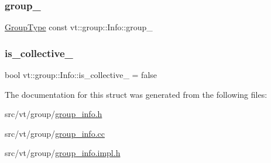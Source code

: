 \mbox{\label{structvt_1_1group_1_1_info_acf2b210e3a0cb0d52649e42f07bc2503}} 
\subsubsection{\texorpdfstring{group\+\_\+}{group\_}}
{\footnotesize\ttfamily \hyperlink{namespacevt_a27b5e4411c9b6140c49100e050e2f743}{Group\+Type} const vt\+::group\+::\+Info\+::group\+\_\+\hspace{0.3cm}{\ttfamily [private]}}

\mbox{\label{structvt_1_1group_1_1_info_acd32c5194bb1d6ac815b1f20cda1944d}} 
\subsubsection{\texorpdfstring{is\+\_\+collective\+\_\+}{is\_collective\_}}
{\footnotesize\ttfamily bool vt\+::group\+::\+Info\+::is\+\_\+collective\+\_\+ = false\hspace{0.3cm}{\ttfamily [private]}}



The documentation for this struct was generated from the following files\+:\begin{DoxyCompactItemize}
\item 
src/vt/group/\hyperlink{group__info_8h}{group\+\_\+info.\+h}\item 
src/vt/group/\hyperlink{group__info_8cc}{group\+\_\+info.\+cc}\item 
src/vt/group/\hyperlink{group__info_8impl_8h}{group\+\_\+info.\+impl.\+h}\end{DoxyCompactItemize}
